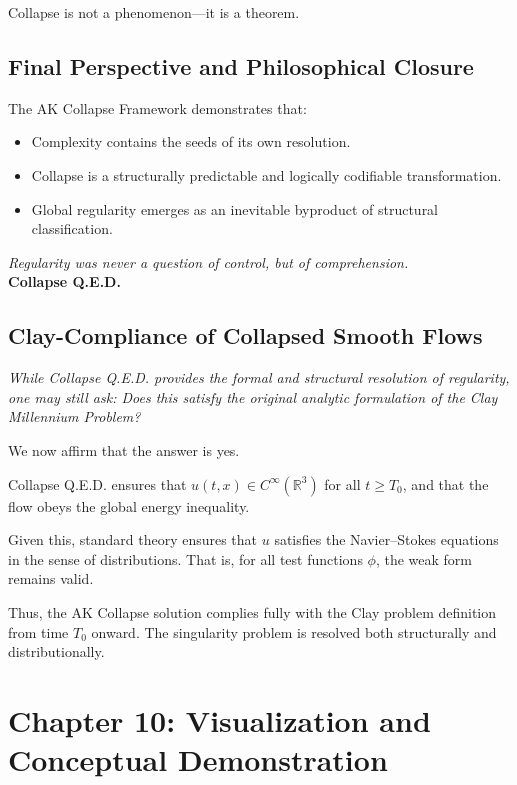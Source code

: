 \documentclass[11pt]{article}
\begin{document}
Collapse is not a phenomenon—it is a theorem.

\subsection{Final Perspective and Philosophical Closure}

The AK Collapse Framework demonstrates that:
\begin{itemize}
  \item Complexity contains the seeds of its own resolution.
  \item Collapse is a structurally predictable and logically codifiable transformation.
  \item Global regularity emerges as an inevitable byproduct of structural classification.
\end{itemize}

\begin{center}
\emph{Regularity was never a question of control, but of comprehension.}  
\\[1ex]
\textbf{Collapse Q.E.D.}
\end{center}


\subsection*{Clay-Compliance of Collapsed Smooth Flows}

\textit{While Collapse Q.E.D. provides the formal and structural resolution of regularity, one may still ask: Does this satisfy the original analytic formulation of the Clay Millennium Problem?}

We now affirm that the answer is yes.


Collapse Q.E.D. ensures that \( u(t,x) \in C^\infty(\mathbb{R}^3) \) for all \( t \geq T_0 \), and that the flow obeys the global energy inequality.

Given this, standard theory ensures that \( u \) satisfies the Navier--Stokes equations in the sense of distributions. That is, for all test functions \( \phi \), the weak form remains valid.

Thus, the AK Collapse solution complies fully with the Clay problem definition from time \( T_0 \) onward. The singularity problem is resolved both structurally and distributionally.



\section{Chapter 10: Visualization and Conceptual Demonstration}
\label{sec:visualization-collapse}
\end{document}
